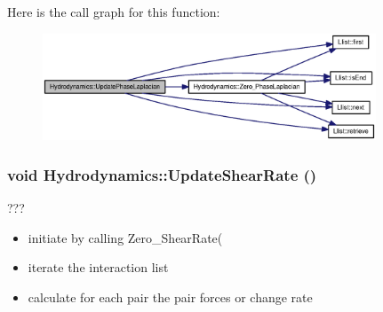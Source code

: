 Here is the call graph for this function:\nopagebreak
\begin{figure}[H]
\begin{center}
\leavevmode
\includegraphics[width=281pt]{classHydrodynamics_dbbe86fd4eac49912a9ffb5e284883ee_cgraph}
\end{center}
\end{figure}
\hypertarget{classHydrodynamics_49570aaeedea32d7a2baf0532880b2e8}{
\subsubsection[{UpdateShearRate}]{\setlength{\rightskip}{0pt plus 5cm}void Hydrodynamics::UpdateShearRate ()}}
\label{classHydrodynamics_49570aaeedea32d7a2baf0532880b2e8}


??? 



\begin{itemize}
\item initiate by calling Zero\_\-ShearRate(\end{itemize}


\begin{itemize}
\item iterate the interaction list\end{itemize}


\begin{itemize}
\item calculate for each pair the pair forces or change rate \end{itemize}


